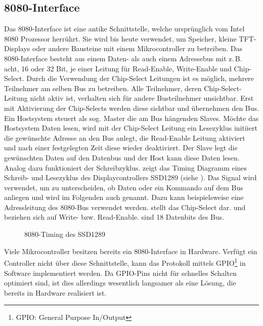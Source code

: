 \subsection{8080-Interface}
Das 8080-Interface ist eine antike Schnittstelle, welche ursprünglich vom Intel 8080 Prozessor herrührt. Sie wird bis heute verwendet, um Speicher, kleine TFT-Displays oder andere Bausteine mit einem Mikrocontroller zu betreiben. Das 8080-Interface besteht aus einem Daten- als auch einem Adressebus mit z.\,B. acht, 16 oder 32 Bit, je einer Leitung für Read-Enable, Write-Enable und Chip-Select. Durch die Verwendung der Chip-Select Leitungen ist es möglich, mehrere Teilnehmer am selben Bus zu betreiben. Alle Teilnehmer, deren Chip-Select-Leitung nicht aktiv ist, verhalten sich für andere Busteilnehmer unsichtbar. Erst mit Aktivierung der Chip-Selects werden diese sichtbar und übernehmen den Bus. Ein Hostsystem steuert als sog. Master die am Bus hängenden Slaves. Möchte das Hostsystem Daten lesen, wird mit der Chip-Select Leitung ein Lesezyklus initiiert die gewünschte Adresse an den Bus anlegt, die Read-Enable Leitung aktiviert und nach einer festgelegten Zeit diese wieder deaktiviert. Der Slave legt die gewünschten Daten auf den Datenbus und der Host kann diese Daten lesen. Analog dazu funktioniert der Schreibzyklus. 
 zeigt das Timing Diagramm eines Schreib- und Lesezyklus des Displaycontrollers SSD1289 (siehe \cite{SSD2007}). Das Signal  wird verwendet, um zu unterscheiden, ob Daten oder ein Kommando auf dem Bus anliegen und wird im Folgenden auch  genannt. Dazu kann beispielsweise eine Adressleitung des 8080-Bus verwendet werden.  stellt das Chip-Select dar.  und  beziehen sich auf Write- bzw. Read-Enable.  sind 18 Datenbits des Bus. 

\begin{figure}[htp]
	\centering
{}
	\caption{8080-Timing des SSD1289}
	\label{fig:8080_timing}
\end{figure}
Viele Mikrocontroller besitzen bereits ein 8080-Interface in Hardware. Verfügt ein Controller nicht über diese Schnittstelle, kann das Protokoll mittels GPIO\footnote{GPIO: General Purpose In/Output} in Software implementiert werden. 
Da GPIO-Pins nicht für schnelles Schalten optimiert sind, ist dies allerdings wesentlich langsamer als eine Lösung, die bereits in Hardware realisiert ist.

